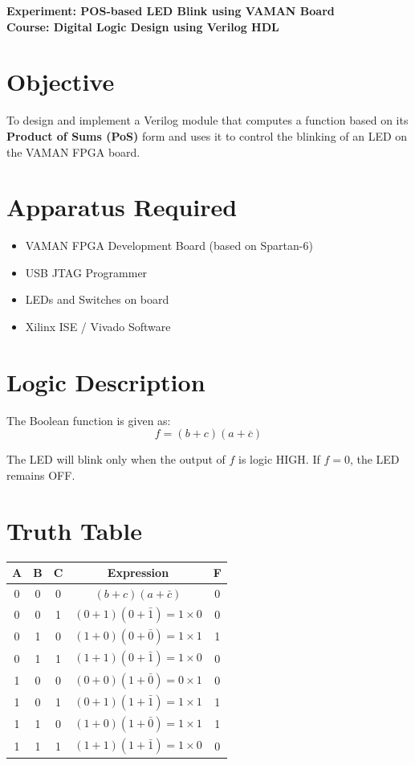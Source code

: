 \documentclass[a4paper,12pt]{article}
\begin{document}
\begin{center}
{\LARGE \textbf{Experiment: POS-based LED Blink using VAMAN Board}} \\[6pt]
\textbf{Course: Digital Logic Design using Verilog HDL}
\end{center}

\section*{Objective}
To design and implement a Verilog module that computes a function based on its \textbf{Product of Sums (PoS)} form and uses it to control the blinking of an LED on the VAMAN FPGA board.

\section*{Apparatus Required}
\begin{itemize}
  \item VAMAN FPGA Development Board (based on Spartan-6)
  \item USB JTAG Programmer
  \item LEDs and Switches on board
  \item Xilinx ISE / Vivado Software
\end{itemize}

\section*{Logic Description}
The Boolean function is given as:
\[
f = (b + c)(a + \overline{c})
\]

The LED will blink only when the output of \( f \) is logic HIGH.  
If \( f = 0 \), the LED remains OFF.

\section*{Truth Table}
\begin{center}
\begin{tabular}{cccc|c}
\toprule
A & B & C & Expression & F \\ 
\midrule
0 & 0 & 0 & $(b+c)(a+\bar{c})$ & 0 \\
0 & 0 & 1 & $(0+1)(0+\bar{1})=1\times0$ & 0 \\
0 & 1 & 0 & $(1+0)(0+\bar{0})=1\times1$ & 1 \\
0 & 1 & 1 & $(1+1)(0+\bar{1})=1\times0$ & 0 \\
1 & 0 & 0 & $(0+0)(1+\bar{0})=0\times1$ & 0 \\
1 & 0 & 1 & $(0+1)(1+\bar{1})=1\times1$ & 1 \\
1 & 1 & 0 & $(1+0)(1+\bar{0})=1\times1$ & 1 \\
1 & 1 & 1 & $(1+1)(1+\bar{1})=1\times0$ & 0 \\
\bottomrule
\end{tabular}
\end{center}
\end{document}
